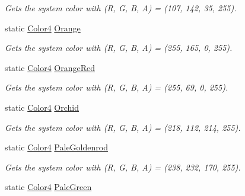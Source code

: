 \begin{DoxyCompactItemize}
\begin{DoxyCompactList}\small\item\em Gets the system color with (R, G, B, A) = (107, 142, 35, 255). \end{DoxyCompactList}\item 
static \hyperlink{struct_open_t_k_1_1_graphics_1_1_color4}{Color4} \hyperlink{struct_open_t_k_1_1_graphics_1_1_color4_a0500d32ad9ec576ab7d4c48860851650}{Orange}
\begin{DoxyCompactList}\small\item\em Gets the system color with (R, G, B, A) = (255, 165, 0, 255). \end{DoxyCompactList}\item 
static \hyperlink{struct_open_t_k_1_1_graphics_1_1_color4}{Color4} \hyperlink{struct_open_t_k_1_1_graphics_1_1_color4_afc067480eff6b4b770c1415dfb5122d6}{Orange\-Red}
\begin{DoxyCompactList}\small\item\em Gets the system color with (R, G, B, A) = (255, 69, 0, 255). \end{DoxyCompactList}\item 
static \hyperlink{struct_open_t_k_1_1_graphics_1_1_color4}{Color4} \hyperlink{struct_open_t_k_1_1_graphics_1_1_color4_a2293a6b66b9236e63174f13343a32787}{Orchid}
\begin{DoxyCompactList}\small\item\em Gets the system color with (R, G, B, A) = (218, 112, 214, 255). \end{DoxyCompactList}\item 
static \hyperlink{struct_open_t_k_1_1_graphics_1_1_color4}{Color4} \hyperlink{struct_open_t_k_1_1_graphics_1_1_color4_a6862037b256b45b818443769578dd941}{Pale\-Goldenrod}
\begin{DoxyCompactList}\small\item\em Gets the system color with (R, G, B, A) = (238, 232, 170, 255). \end{DoxyCompactList}\item 
static \hyperlink{struct_open_t_k_1_1_graphics_1_1_color4}{Color4} \hyperlink{struct_open_t_k_1_1_graphics_1_1_color4_a942e28da2ed49feea8d2b034d76d8f84}{Pale\-Green}

\end{DoxyCompactItemize}
